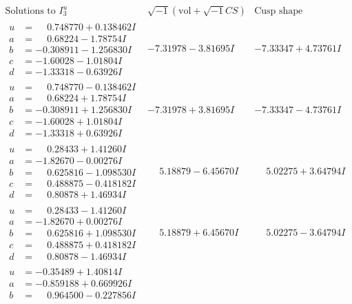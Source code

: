 \documentclass[1p]{elsarticle_modified}
\theoremstyle{definition}
\newcommand{\I}{\sqrt{-1}}
\begin{document}
$$\begin{array}{c|c|c}  
\text{Solutions to }I^u_{3}& \I (\text{vol} + \sqrt{-1}CS) & \text{Cusp shape}\\
 \hline 
\begin{aligned}
u &= \phantom{-}0.748770 + 0.138462 I \\
a &= \phantom{-}0.68224 - 1.78754 I \\
b &= -0.308911 - 1.256830 I \\
c &= -1.60028 - 1.01804 I \\
d &= -1.33318 - 0.63926 I\end{aligned}
 & -7.31978 - 3.81695 I & -7.33347 + 4.73761 I \\ \hline\begin{aligned}
u &= \phantom{-}0.748770 - 0.138462 I \\
a &= \phantom{-}0.68224 + 1.78754 I \\
b &= -0.308911 + 1.256830 I \\
c &= -1.60028 + 1.01804 I \\
d &= -1.33318 + 0.63926 I\end{aligned}
 & -7.31978 + 3.81695 I & -7.33347 - 4.73761 I \\ \hline\begin{aligned}
u &= \phantom{-}0.28433 + 1.41260 I \\
a &= -1.82670 - 0.00276 I \\
b &= \phantom{-}0.625816 - 1.098530 I \\
c &= \phantom{-}0.488875 - 0.418182 I \\
d &= \phantom{-}0.80878 + 1.46934 I\end{aligned}
 & \phantom{-}5.18879 - 6.45670 I & \phantom{-}5.02275 + 3.64794 I \\ \hline\begin{aligned}
u &= \phantom{-}0.28433 - 1.41260 I \\
a &= -1.82670 + 0.00276 I \\
b &= \phantom{-}0.625816 + 1.098530 I \\
c &= \phantom{-}0.488875 + 0.418182 I \\
d &= \phantom{-}0.80878 - 1.46934 I\end{aligned}
 & \phantom{-}5.18879 + 6.45670 I & \phantom{-}5.02275 - 3.64794 I \\ \hline\begin{aligned}
u &= -0.35489 + 1.40814 I \\
a &= -0.859188 + 0.669926 I \\
b &= \phantom{-}0.964500 - 0.227856 I \\

\end{aligned}
\end{array}$$
\end{document}
